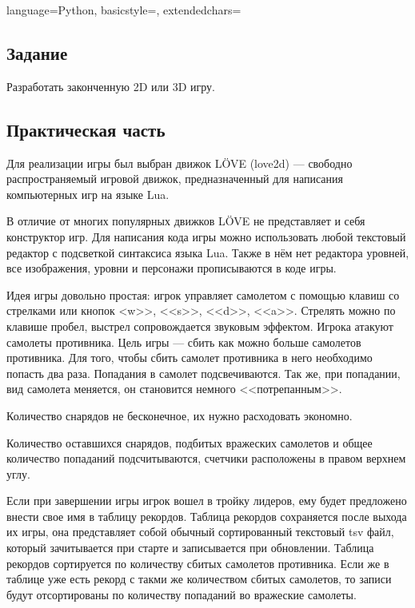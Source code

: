 \documentclass[12pt]{article}
\begin{document}

\lstset
{
        language=Python,
        basicstyle=\footnotesize,%
        extendedchars=\true
}

\subsection*{Задание}

Разработать законченную 2D или 3D игру.

\subsection*{Практическая часть}
Для реализации игры был выбран движок LÖVE (love2d) --- свободно распространяемый игровой движок,
предназначенный для написания компьютерных игр на языке Lua.

В отличие от многих популярных движков LÖVE не представляет и себя конструктор игр.
Для написания кода игры можно использовать любой текстовый редактор с подсветкой синтаксиса языка Lua.
Также в нём нет редактора уровней, все изображения, уровни и персонажи прописываются в коде игры.~\cite{love}

Идея игры довольно простая: игрок управляет самолетом с помощью клавиш со стрелками или кнопок
<w>>, <<s>>, <<d>>, <<a>>. Стрелять можно по клавише пробел, выстрел сопровождается звуковым эффектом.
Игрока атакуют самолеты противника. Цель игры --- сбить как можно больше
самолетов противника. Для того, чтобы сбить самолет противника в него необходимо попасть два раза.
Попадания в самолет подсвечиваются. Так же, при попадании, вид самолета меняется, он становится
немного <<потрепанным>>.

Количество снарядов не бесконечное, их нужно расходовать экономно.

Количество оставшихся снарядов, подбитых вражеских самолетов и общее количество попаданий
подсчитываются, счетчики расположены в правом верхнем углу.

Если при завершении игры игрок вошел в тройку лидеров, ему будет предложено внести свое
имя в таблицу рекордов.
Таблица рекордов сохраняется после выхода их игры, она представляет собой обычный
сортированный текстовый tsv файл, который зачитывается при старте и записывается при
обновлении. Таблица рекордов сортируется по количеству сбитых самолетов противника.
Если же в таблице уже есть рекорд с такми же количеством сбитых самолетов, то записи
будут отсортированы по количеству попаданий во вражеские самолеты.
\end{document}
